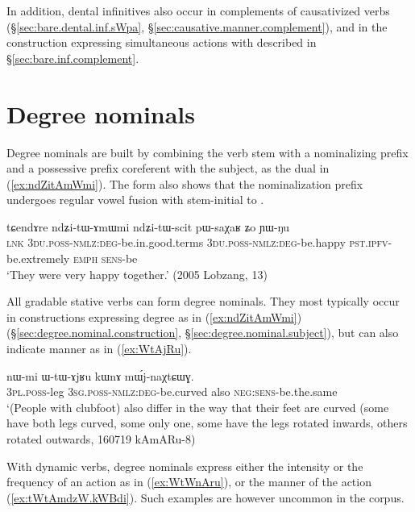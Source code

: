 In addition, dental infinitives also occur in complements of causativized verbs (§\ref{sec:bare.dental.inf.sWpa}, §\ref{sec:causative.manner.complement}), and in the construction expressing simultaneous actions with  described in §\ref{sec:bare.inf.complement}.

\section{Degree nominals} \label{sec:degree.nominals}

Degree nominals are built by combining the verb stem with a nominalizing  prefix and a possessive prefix coreferent with the subject, as the dual  in (\ref{ex:ndZitAmWmi}). The form  also shows that the nominalization  prefix undergoes regular vowel fusion with stem-initial  to . 

 \begin{exe}
\ex \label{ex:ndZitAmWmi}
\gll  tɕendɤre ndʑi-tɯ-ɤmɯmi ndʑi-tɯ-scit pɯ-saχaʁ ʑo ɲɯ-ŋu \\
 \textsc{lnk} \textsc{3du}.\textsc{poss}-\textsc{nmlz}:\textsc{deg}-be.in.good.terms \textsc{3du}.\textsc{poss}-\textsc{nmlz}:\textsc{deg}-be.happy \textsc{pst}.\textsc{ipfv}-be.extremely \textsc{emph} \textsc{sens}-be \\
 \glt `They were very happy together.' (2005 Lobzang, 13)
\end{exe}

All gradable stative verbs can form degree nominals. They most typically occur in constructions expressing degree as in (\ref{ex:ndZitAmWmi}) (§\ref{sec:degree.nominal.construction}, §\ref{sec:degree.nominal.subject}), but can also indicate manner as in (\ref{ex:WtAjRu}).

 \begin{exe}
	\ex \label{ex:WtAjRu}
	\gll nɯ-mi ɯ-tɯ-ɤjʁu kɯnɤ mɯ́j-naχtɕɯɣ. \\
	\textsc{3pl}.\textsc{poss}-leg \textsc{3sg}.\textsc{poss}-\textsc{nmlz}:\textsc{deg}-be.curved also \textsc{neg}:\textsc{sens}-be.the.same \\
	\glt `(People with clubfoot) also differ in the way that their feet are curved (some have both legs curved, some only one, some have the legs rotated inwards, others rotated outwards, 160719 kAmARu-8) 
\end{exe}

With dynamic verbs, degree nominals express either the intensity or the frequency of an action as in (\ref{ex:WtWnAru}), or the manner of the action (\ref{ex:tWtAmdzW.kWBdi}). Such examples are however uncommon in the corpus.


